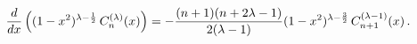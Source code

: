 \[\frac{d}{dx}\left((1-x^{2})^{\lambda-\frac{1}{2}}\mathop{C^{(\lambda)}_{n}\/}%
\nolimits\!\left(x\right)\right)=-\frac{(n+1)(n+2\lambda-1)}{2(\lambda-1)}{(1-%
x^{2})^{\lambda-\frac{3}{2}}}\mathop{C^{(\lambda-1)}_{n+1}\/}\nolimits\!\left(%
x\right).\]
